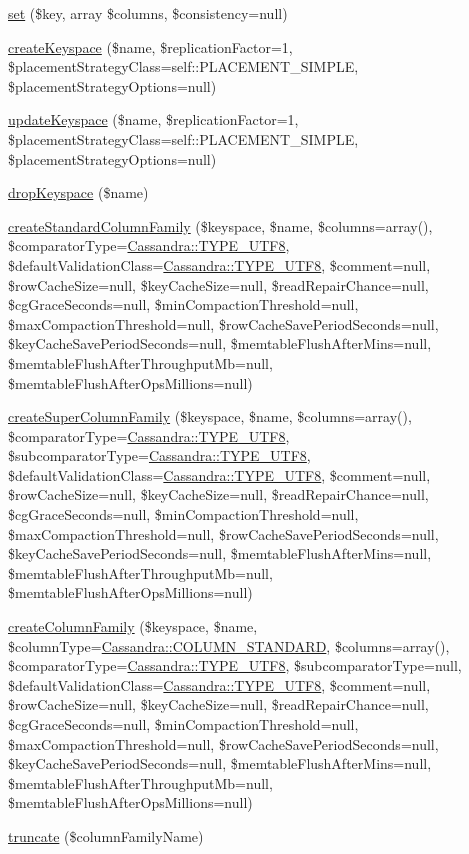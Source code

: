 \begin{DoxyCompactItemize}
\hyperlink{classCassandra_ada5af7349bbec677ea2b068b4f426707}{set} (\$key, array \$columns, \$consistency=null)
\item 
\hyperlink{classCassandra_ab249eab7f62e3076829c1f4e376dbc18}{createKeyspace} (\$name, \$replicationFactor=1, \$placementStrategyClass=self::PLACEMENT\_\-SIMPLE, \$placementStrategyOptions=null)
\item 
\hyperlink{classCassandra_a4b0b56e3354e7d59efa5a0fdda488be1}{updateKeyspace} (\$name, \$replicationFactor=1, \$placementStrategyClass=self::PLACEMENT\_\-SIMPLE, \$placementStrategyOptions=null)
\item 
\hyperlink{classCassandra_a1422aecd02d9727bc26f1d6546a10151}{dropKeyspace} (\$name)
\item 
\hyperlink{classCassandra_a382ac999e181b0d0f735a76ddf28d0ff}{createStandardColumnFamily} (\$keyspace, \$name, \$columns=array(), \$comparatorType=\hyperlink{classCassandra_ac03a89bd430178d9bce987eba8001b82}{Cassandra::TYPE\_\-UTF8}, \$defaultValidationClass=\hyperlink{classCassandra_ac03a89bd430178d9bce987eba8001b82}{Cassandra::TYPE\_\-UTF8}, \$comment=null, \$rowCacheSize=null, \$keyCacheSize=null, \$readRepairChance=null, \$cgGraceSeconds=null, \$minCompactionThreshold=null, \$maxCompactionThreshold=null, \$rowCacheSavePeriodSeconds=null, \$keyCacheSavePeriodSeconds=null, \$memtableFlushAfterMins=null, \$memtableFlushAfterThroughputMb=null, \$memtableFlushAfterOpsMillions=null)
\item 
\hyperlink{classCassandra_a121a87352eb88b7dc8de38188ecdd8c6}{createSuperColumnFamily} (\$keyspace, \$name, \$columns=array(), \$comparatorType=\hyperlink{classCassandra_ac03a89bd430178d9bce987eba8001b82}{Cassandra::TYPE\_\-UTF8}, \$subcomparatorType=\hyperlink{classCassandra_ac03a89bd430178d9bce987eba8001b82}{Cassandra::TYPE\_\-UTF8}, \$defaultValidationClass=\hyperlink{classCassandra_ac03a89bd430178d9bce987eba8001b82}{Cassandra::TYPE\_\-UTF8}, \$comment=null, \$rowCacheSize=null, \$keyCacheSize=null, \$readRepairChance=null, \$cgGraceSeconds=null, \$minCompactionThreshold=null, \$maxCompactionThreshold=null, \$rowCacheSavePeriodSeconds=null, \$keyCacheSavePeriodSeconds=null, \$memtableFlushAfterMins=null, \$memtableFlushAfterThroughputMb=null, \$memtableFlushAfterOpsMillions=null)
\item 
\hyperlink{classCassandra_a19f2f88752029346ee737805a0d3c022}{createColumnFamily} (\$keyspace, \$name, \$columnType=\hyperlink{classCassandra_a5b7fd78b8f044623445d9e9a8f175790}{Cassandra::COLUMN\_\-STANDARD}, \$columns=array(), \$comparatorType=\hyperlink{classCassandra_ac03a89bd430178d9bce987eba8001b82}{Cassandra::TYPE\_\-UTF8}, \$subcomparatorType=null, \$defaultValidationClass=\hyperlink{classCassandra_ac03a89bd430178d9bce987eba8001b82}{Cassandra::TYPE\_\-UTF8}, \$comment=null, \$rowCacheSize=null, \$keyCacheSize=null, \$readRepairChance=null, \$cgGraceSeconds=null, \$minCompactionThreshold=null, \$maxCompactionThreshold=null, \$rowCacheSavePeriodSeconds=null, \$keyCacheSavePeriodSeconds=null, \$memtableFlushAfterMins=null, \$memtableFlushAfterThroughputMb=null, \$memtableFlushAfterOpsMillions=null)
\item 
\hyperlink{classCassandra_ad5b9ce7720a1c4b015abaaea988edfe1}{truncate} (\$columnFamilyName)
\end{DoxyCompactItemize}
